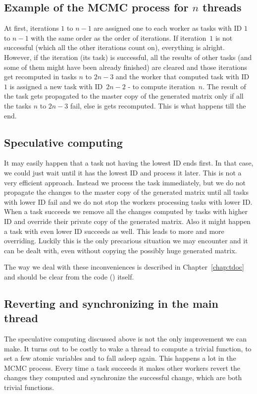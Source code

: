 \subsection{Example of the MCMC process for $n$ threads}
At first, iterations $1$ to $n-1$ are assigned one to each worker as tasks with ID $1$ to $n-1$ with the same order as the order of iterations. If iteration~$1$ is not successful (which all the other iterations count on), everything is alright. However, if the iteration (its task) is successful, all the results of other tasks (and some of them might have been already finished) are cleared and those iterations get recomputed in tasks $n$ to $2n-3$ and the worker that computed task with ID $1$ is assigned a new task with ID~$2n-2$ - to compute iteration~$n$. The result of the task gets propagated to the master copy of the generated matrix only if all the tasks $n$ to $2n-3$ fail, else is gets recomputed. This is what happens till the end.

\subsection{Speculative computing}
It may easily happen that a task not having the lowest ID ends first. In that case, we could just wait until it has the lowest ID and process it later. This is not a very efficient approach. Instead we process the task immediately, but we do not propagate the changes to the master copy of the generated matrix until all tasks with lower ID fail and we do not stop the workers processing tasks with lower ID. When a task succeeds we remove all the changes computed by tasks with higher ID and override their private copy of the generated matrix. Also it might happen a task with even lower ID succeeds as well. This leads to more and more overriding. Luckily this is the only precarious situation we may encounter and it can be dealt with, even without copying the possibly huge generated matrix.

The way we deal with these inconveniences is described in Chapter~\ref{chap:tdoc} and should be clear from the code (\cite{program}) itself.

\subsection{Reverting and synchronizing in the main thread}
The speculative computing discussed above is not the only improvement
we can make. It turns out to be costly to wake a thread to compute a trivial function, to set a few atomic variables and to fall asleep again. This happens a lot in the MCMC process. Every time a task succeeds it makes other workers revert the changes they computed and synchronize the successful change, which are both trivial functions.

